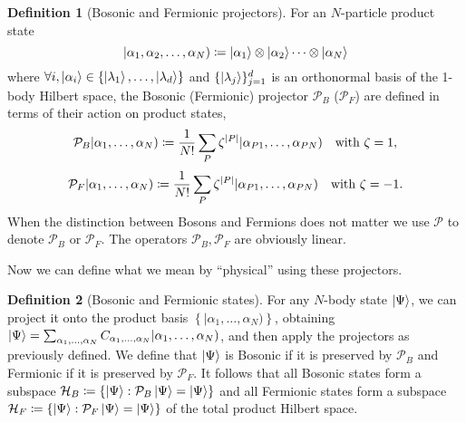 \documentclass{article}
\theoremstyle{definition}
\newtheorem{dfn}{Definition}[section]
\theoremstyle{plain}
\numberwithin{equation}{section}
\begin{document}
\begin{dfn}[Bosonic and Fermionic projectors]
    For an $N$-particle product state 
    \begin{equation}
        |\alpha_1, \alpha_2, \ldots ,\alpha_{N})
    \coloneqq \ket{\alpha_1} \otimes \ket{\alpha_2}\cdots \otimes \ket{\alpha_{N}}
    \end{equation}
    where $\forall i, \ket{\alpha_{i}} \in 
    \{\ket{\lambda_1}, \ldots ,\ket{\lambda_{d}}\}$ 
    and $\{\ket{\lambda_{j}}\}_{j=1}^{d}$ is an orthonormal basis 
    of the 1-body Hilbert space, 
    the Bosonic (Fermionic) projector $\mathcal{P}_{B}$ ($\mathcal{P}_{F}$) 
    are defined in terms of their action on product states,  
    \begin{equation}
        \mathcal{P}_{B}|\alpha_1, \ldots ,\alpha_{N})
        \coloneqq
        \frac{1}{N!} \sum_{P}\zeta^{\abs{P}} 
        |\alpha_{P1}, \ldots ,\alpha_{PN})
        \quad \text{with } \zeta = 1,
    \end{equation}
    \begin{equation}
        \mathcal{P}_{F}|\alpha_1, \ldots ,\alpha_{N})
        \coloneqq
        \frac{1}{N!} \sum_{P}\zeta^{\abs{P}} 
        |\alpha_{P1}, \ldots ,\alpha_{PN})
        \quad \text{with } \zeta = -1.
    \end{equation}
    When the distinction between Bosons and Fermions does not matter 
    we use $\mathcal{P}$ to denote $\mathcal{P}_{B}$ or $\mathcal{P}_{F}$. 
    The operators $\mathcal{P}_{B}, \mathcal{P}_{F}$ 
    are obviously linear.
\end{dfn}

Now we can define what we mean by ``physical'' using 
these projectors. 

\begin{dfn}[Bosonic and Fermionic states]
    \label{dfn:bosonic-and-fermionic-states}
    For any $N$-body state $\ket{\Psi}$, we can project it 
    onto the product basis 
    $\left\{ |\alpha_1, \ldots ,\alpha_{N}) \right\}$, 
    obtaining 
    $\ket{\Psi}=\sum_{\alpha_1, \ldots ,\alpha_{N}} 
    C_{\alpha_1, \ldots ,\alpha_{N}}
    |\alpha_1, \ldots ,\alpha_{N})$, 
    and then apply the projectors as previously defined. 
    We define that $\ket{\Psi}$ is Bosonic if it is preserved by $\mathcal{P}_{B}$ 
    and Fermionic if it is preserved by $\mathcal{P}_{F}$. 
    It follows that all Bosonic states form a subspace 
    $\mathcal{H}_{B}\coloneqq \left\{ \ket{\Psi} : \mathcal{P}_{B} \ket{\Psi}=\ket{\Psi} \right\}$
    and all Fermionic states form a subspace 
    $\mathcal{H}_{F}\coloneqq \left\{ \ket{\Psi} : \mathcal{P}_{F} \ket{\Psi}=\ket{\Psi} \right\}$ of the total product Hilbert space.
\end{dfn}
\end{document}
